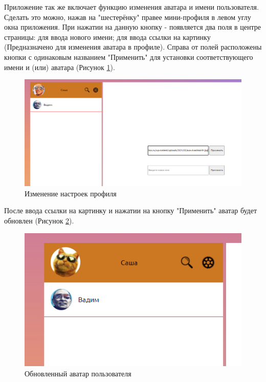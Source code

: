 \documentclass[14pt,final]{report}
\begin{document}
\par
Приложение так же включает функцию изменения аватара и имени пользователя. Сделать это можно, нажав на "шестерёнку"  правее мини-профиля в левом углу окна приложения. При нажатии на данную кнопку - появляется два поля в центре страницы: для ввода нового имени; для ввода ссылки на картинку (Предназначено для изменения аватара в профиле). Справа от полей расположены кнопки с одинаковым названием "Применить" для установки соответствующего имени и (или) аватара (Рисунок \ref{fig:my_label4}).
\begin{figure}[H]
    \centering
    \includegraphics[width=13cm]{SmenaAvatara.png}
    \caption{Изменение настроек профиля}
    \label{fig:my_label4}
\end{figure}
\par
После ввода ссылки на картинку и нажатии на кнопку "Применить" аватар будет обновлен (Рисунок \ref{fig:my_label5}).
\begin{figure}[H]
    \centering
    \includegraphics[width=13cm]{SmenaAvatara1.png}
    \caption{Обновленный аватар пользователя}
    \label{fig:my_label5}
\end{figure}
\par
\end{document}
